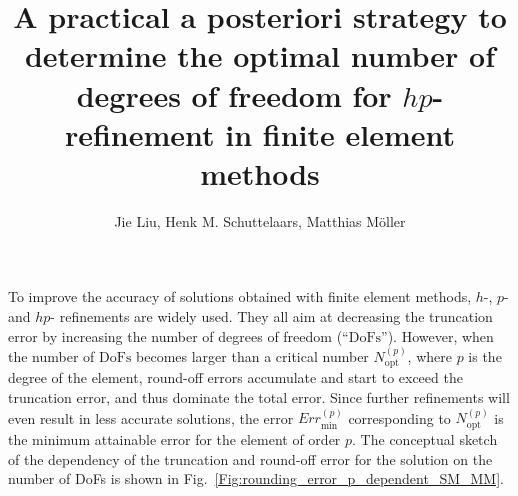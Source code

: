 \documentclass[a4paper]{article}
\begin{document}
\title{A practical a posteriori strategy to determine the optimal number of degrees of freedom for $hp$-refinement in finite element methods}
\date{\vspace{-5ex}}

\author{Jie Liu, Henk M. Schuttelaars, Matthias M\"oller}	%


\maketitle

To improve the accuracy of solutions obtained with finite element methods, $h$-, $p$- and $hp$- refinements are widely used. They all aim at decreasing the truncation error by increasing the number of degrees of freedom (``$\text{DoFs}$'').
However, when the number of $\text{DoFs}$ becomes larger than a critical number $N_{\text{opt}} ^{(p)}$, where $p$ is the degree of the element, round-off errors accumulate and start to exceed the truncation error, and thus dominate the total error. Since further refinements will even result in less accurate solutions, the error ${Err}_{\text{min}}^{(p)}$ corresponding to $N_{\text{opt}} ^{(p)}$ is the minimum attainable error for the element of order $p$. The conceptual sketch of the dependency of the truncation and round-off error for the solution on the number of DoFs is shown in Fig.~\ref{Fig:rounding_error_p_dependent_SM_MM}\cite{LiuMH2018apractical}.

\end{document}
